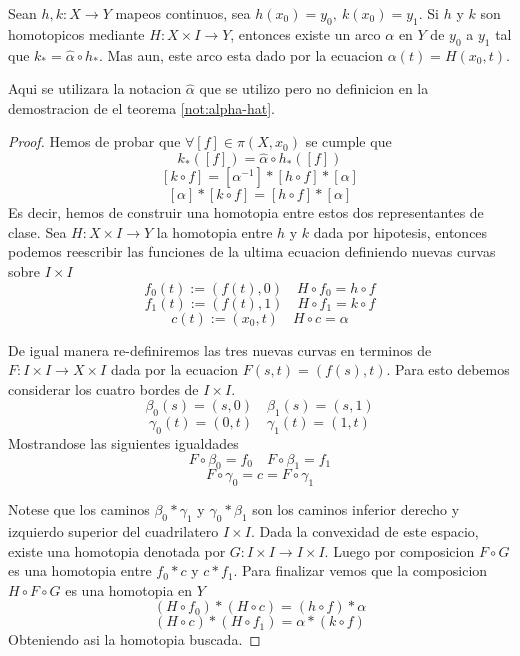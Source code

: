 \begin{lema} \label{lem:equiv-hom-lift}
  Sean \(h,k : X \to Y\) mapeos continuos, sea \(h (x_0) = y_0,\ k(x_0)
  = y_1\). Si \(h\) y \(k\) son homotopicos mediante \(H : X \times I
  \to Y\), entonces existe un arco \(\alpha\) en \(Y\) de \(y_0\) a
  \(y_1\) tal que \(k_* = \hat \alpha \circ h_* \). Mas aun, este arco
  esta dado por la ecuacion \(\alpha (t) = H (x_0, t)\).
\end{lema}
\noindent Aqui se utilizara la notacion \(\hat \alpha\) que se utilizo
pero no definicion en la demostracion de el teorema \ref{not:alpha-hat}.
\begin{proof}
  Hemos de probar que \(\forall [f] \in \pi (X, x_0)\) se cumple que
  \[ k_* ([f]) = \hat \alpha \circ h_* ([f]) \]
  \[ [k \circ f] = [ \alpha^{-1} ] *  [h \circ f] * [\alpha] \]
  \[ [ \alpha ] * [k \circ f] =  [h \circ f] * [\alpha] \]
  Es decir, hemos de construir una homotopia entre estos dos
  representantes de clase. Sea \(H : X \times I \to Y\) la homotopia
  entre \(h\) y \(k\) dada por hipotesis, entonces podemos reescribir
  las funciones de la ultima ecuacion definiendo nuevas curvas sobre \(I
  \times I\)
  \[ f_0(t) := (f(t), 0) \quad H \circ f_0 = h \circ f \]
  \[ f_1(t) := (f(t), 1) \quad H \circ f_1 = k \circ f \]
  \[ c(t) := (x_0, t) \quad H \circ c = \alpha \]

  De igual manera re-definiremos las tres nuevas curvas en terminos de
  \(F : I \times I \to X \times I\) dada por la ecuacion \(F(s,t) =
  (f(s),t)\). Para esto debemos considerar los cuatro bordes de
  \(I \times I\).
  \[ \beta_0(s) = (s, 0) \quad \beta_1(s) = (s, 1)\]
  \[ \gamma_0(t) = (0, t) \quad \gamma_1(t) = (1, t)\]
  Mostrandose las siguientes igualdades
  \[ F \circ \beta_0 = f_0 \quad F \circ \beta_1 = f_1\]
  \[ F \circ \gamma_0 = c = F \circ \gamma_1 \]

  Notese que los caminos \(\beta_0 * \gamma_1\) y \(\gamma_0 * \beta_1\)
  son los caminos inferior derecho y izquierdo superior del cuadrilatero
  \(I \times I\). Dada la convexidad de este espacio, existe una
  homotopia denotada por \(G : I \times I \to I \times I \). Luego por
  composicion \(F \circ G\) es una homotopia entre \(f_0 * c\) y \(c *
  f_1\). Para finalizar vemos que la composicion \(H \circ F \circ G\)
  es una homotopia en \(Y\)
  \[ (H \circ f_0) * (H \circ c) = (h \circ f) * \alpha \]
  \[ (H \circ c) * (H \circ f_1) = \alpha * (k \circ f) \]
  Obteniendo asi la homotopia buscada.
\end{proof}

